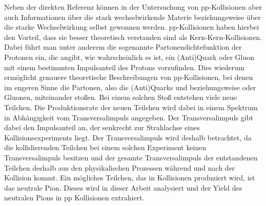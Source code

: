 Neben der direkten Referenz können in der Untersuchung von pp-Kollisionen aber auch Informationen über die stark wechselwirkende Materie beziehungsweise über die starke Wechselwirkung selbst gewonnen werden.
pp-Kollisionen haben hierbei den Vorteil, dass sie besser theoretisch verstanden sind als Kern-Kern-Kollisionen.
Dabei führt man unter anderem die sogenannte Partonendichtefunktion der Protonen ein, die angibt, wie wahrscheinlich es ist, ein (Anti)Quark oder Gluon mit einem bestimmten Impulsanteil des Protons vorzufinden.
Dies wiederum ermöglicht genauere theoretische Beschreibungen von pp-Kollisionen, bei denen im engeren Sinne die Partonen, also die (Anti)Quarks und beziehungsweise oder Gluonen, miteinander stoßen.
\newline
Bei einem solchen Stoß entstehen viele neue Teilchen.
Die Produktionsrate der neuen Teilchen wird dabei in einem Spektrum in Abhängigkeit vom Transversalimpuls angegeben.
Der Transversalimpuls gibt dabei den Impulsanteil an, der senkrecht zur Strahlachse eines Kollisionsexperiments liegt.
Der Transversalimpuls wird deshalb betrachtet, da die kollidierenden Teilchen bei einem solchen Experiment keinen Transversalimpuls besitzen und der gesamte Transversalimpuls der entstandenen Teilchen deshalb aus den physikalischen Prozessen während und nach der Kollision kommt.
\newline
Ein mögliches Teilchen, das in Kollisionen produziert wird, ist das neutrale Pion.
Dieses wird in dieser Arbeit analysiert und der Yield des neutralen Pions in pp Kollisionen extrahiert.
